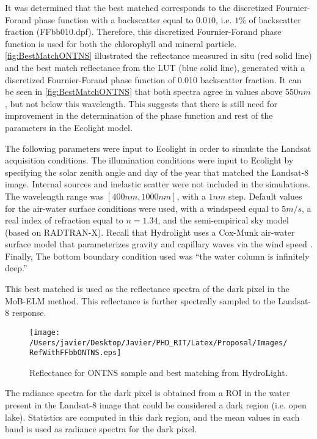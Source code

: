 It was determined that the best matched corresponds to the discretized Fournier-Forand phase function with a backscatter equal to $0.010$, i.e. $1\%$ of backscatter fraction (FFbb010.dpf). Therefore, this discretized Fournier-Forand phase function is used for both the chlorophyll and mineral particle. \autoref{fig:BestMatchONTNS} illustrated the reflectance measured in situ (red solid line) and the best match reflectance from the LUT (blue solid line), generated with a discretized Fournier-Forand phase function of 0.010 backscatter fraction. It can be seen in \autoref{fig:BestMatchONTNS} that both spectra agree in values above $550nm$, but not below this wavelength. This suggests that there is still need for improvement in the determination of the phase function and rest of the parameters in the Ecolight model.

The following parameters were input to Ecolight in order to simulate the Landsat acquisition conditions. The illumination conditions were input to Ecolight by specifying the solar zenith angle and day of the year that matched the Landsat-8 image. Internal sources and inelastic scatter were not included in the simulations. The wavelength range was $[400nm,1000nm]$, with a $1nm$ step. Default values for the air-water surface conditions were used, with a windspeed equal to $5m/s$, a real index of refraction equal to $n=1.34$, and the semi-empirical sky model (based on RADTRAN-X). Recall that Hydrolight uses a Cox-Munk air-water surface model that parameterizes gravity and capillary waves via the wind speed . Finally, The bottom boundary condition used was ``the water column is infinitely deep.''

This best matched is used as the reflectance spectra of the dark pixel in the MoB-ELM method. This reflectance is further spectrally sampled to the Landsat-8 response. 

\begin{figure}[htb]
  	\centering
  	\texttt{[image: /Users/javier/Desktop/Javier/PHD\_RIT/Latex/Proposal/Images/RefWithFFbbONTNS.eps]}
  \caption{Reflectance for ONTNS sample and best matching from HydroLight. \label{fig:BestMatchONTNS} } 
\end{figure}

The radiance spectra for the dark pixel is obtained from a ROI in the water present in the Landsat-8 image that could be considered a dark region (i.e. open lake). Statistics are computed in this dark region, and the mean values in each band is used as radiance spectra for the dark pixel.

